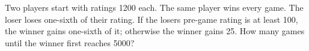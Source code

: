 Two players start with ratings 1200 each. The same player wins every game. The loser loses one-sixth of their rating. If the loser\textquotesingle s pre-game rating is at least 100, the winner gains one-sixth of it; otherwise the winner gains 25. How many games until the winner first reaches 5000?
